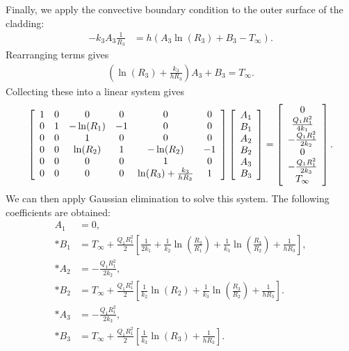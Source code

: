 Finally, we apply the convective boundary condition to the outer surface of the cladding:
\begin{align}
  -k_3 A_3 \frac{1}{R_3} &= h \left( A_3 \ln( R_3 ) + B_3 - T_\infty \right).
\end{align}
Rearranging terms gives
\begin{align}
  \left( \ln(R_3) +  \frac{k_3}{h R_3} \right) A_3 + B_3 = T_\infty .
\end{align}
Collecting these into a linear system gives
\begin{align}
  \left[ \begin{array}{c c c c c c}
  1 & 0 &         0 &  0 &         0 &  0 \\
  0 & 1 & -\ln(R_1) & -1 &         0 &  0 \\
  0 & 0 &         1 &  0 &         0 &  0 \\
  0 & 0 &  \ln(R_2) &  1 & -\ln(R_2) & -1 \\
  0 & 0 &         0 &  0 &         1 &  0 \\
  0 & 0 &         0 &  0 & \ln(R_3) + \frac{k_3}{h R_3} & 1 \\ \end{array} \right]
  \left[ \begin{array}{c} A_1 \\ B_1 \\ A_2 \\ B_2 \\ A_3 \\ B_3 \end{array} \right] =
  \left[ \begin{array}{c}                        0 \\ \frac{Q_1 R_1^2}{4 k_1} \\ 
                          -\frac{Q_1 R_1^2}{2 k_2} \\ 0 \\
                          -\frac{Q_1 R_1^2}{2 k_3} \\ T_\infty \\ \end{array} \right] .
\end{align}
We can then apply Gaussian elimination to solve this system. The following coefficients are obtained:
\begin{subequations}
\begin{align}
  A_1 &= 0, \\*
  B_1 &= T_\infty + \frac{Q_1 R_1^2}{2} \left[ \frac{1}{2k_1} + \frac{1}{k_2} \ln \left( \frac{R_2}{R_1} \right) 
                                             + \frac{1}{k_3} \ln \left( \frac{R_3}{R_2} \right)  + \frac{1}{h R_3} \right], \\*
  A_2 &= -\frac{Q_1 R_1^2}{2 k_2}, \\*
  B_2 &= T_\infty + \frac{Q_1 R_1^2}{2} \left[ \frac{1}{k_2} \ln(R_2) + \frac{1}{k_3} \ln \left( \frac{R_3}{R_2} \right) + \frac{1}{h R_3} \right] . \\*
  A_3 &= -\frac{Q_1 R_1^2}{2 k_3}, \\*
  B_3 &= T_\infty + \frac{Q_1 R_1^2}{2} \left[ \frac{1}{k_3} \ln(R_3) + \frac{1}{h R_3} \right] .
\end{align}
\end{subequations}
